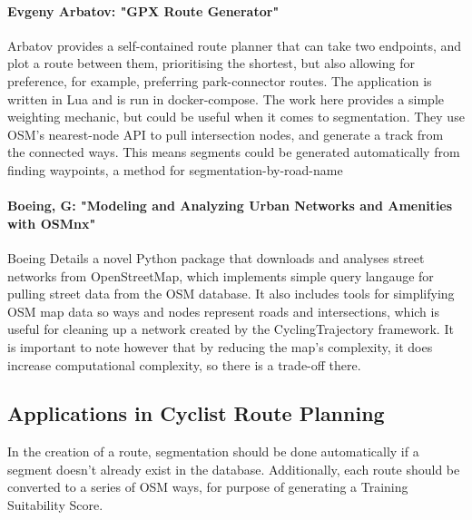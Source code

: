 \documentclass[12pt,a4paper]{report}
\begin{document}
\paragraph{Evgeny Arbatov: "GPX Route Generator"}
Arbatov provides a self-contained route planner that can take two endpoints, and plot a route between them, prioritising the shortest, but also allowing for preference, for example, preferring park-connector routes.
The application is written in Lua and is run in docker-compose. The work here provides a simple weighting mechanic, but could be useful when it comes to segmentation.
They use OSM's nearest-node API to pull intersection nodes, and generate a track from the connected ways. This means segments could be generated automatically from finding waypoints, a method for segmentation-by-road-name

\paragraph{Boeing, G: "Modeling and Analyzing Urban Networks and Amenities with OSMnx"}
Boeing Details a novel Python package that downloads and analyses street networks from OpenStreetMap, which implements simple query langauge for pulling street data from the OSM database. It also includes tools for simplifying OSM map data so
ways and nodes represent roads and intersections, which is useful for cleaning up a network created by the CyclingTrajectory framework. It is important to note however that by reducing the map's complexity, it does increase computational complexity, so there is a trade-off there.



\subsection{Applications in Cyclist Route Planning}
In the creation of a route, segmentation should be done automatically if a segment doesn't already exist in the database. Additionally, each route should be converted to
a series of OSM ways, for purpose of generating a Training Suitability Score.
\end{document}
